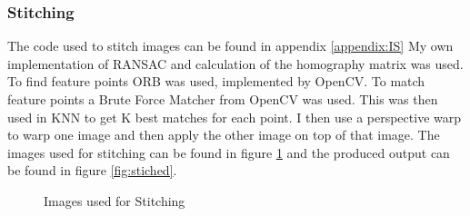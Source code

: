 \documentclass{article}
\begin{document}
    \subsubsection{Stitching}
    The code used to stitch images can be found in appendix \ref{appendix:IS}
    My own implementation of RANSAC and calculation of the homography matrix was used. To find feature points
    ORB was used, implemented by OpenCV. To match feature points a Brute Force Matcher from OpenCV was used. This was then used in KNN to get K best matches
    for each point. I then use a perspective warp to warp one image and then apply the other image on top of that image. 
    The images used for stitching can be found in figure \ref{fig:originalStitch} and the produced output can be found in figure \ref{fig:stiched}.

    \begin{figure}[H]
        \centering
        \quad
        \caption{Images used for Stitching}
        \label{fig:originalStitch}
    \end{figure}
\end{document}
